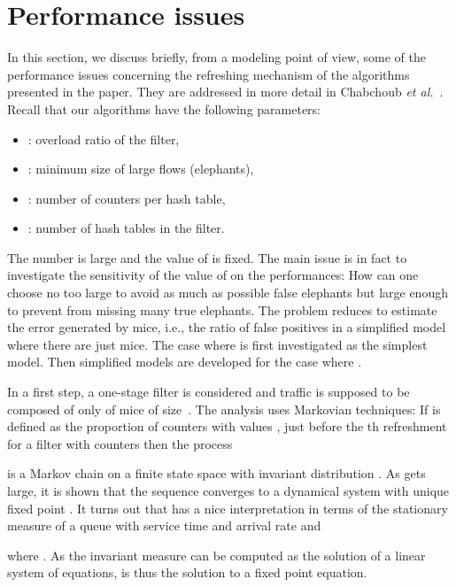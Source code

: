\documentclass{amsart}
\def\etal{{\em et al.}}
\begin{document}
\section{Performance issues} \label{discussion}
In  this section,  we  discuss  briefly, from  a  modeling point  of  view,  some of  the
performance issues concerning the refreshing  mechanism of the algorithms presented in the
paper.      They     are      addressed      in     more      detail     in      Chabchoub
\etal~\cite{Chabchoub:02,Chabchoub-3}.   Recall  that our  algorithms  have the  following
parameters:
\begin{itemize}
\item : overload ratio of the filter,
\item : minimum size of large flows (elephants), 
\item : number of counters per hash table,
\item : number of hash tables in the filter.
\end{itemize}
The number   is large  and the value  of  is  fixed.  The main  issue is in  fact to
investigate the sensitivity  of the value of   on the performances: How  can one choose
 no too large to avoid as much  as possible false elephants but large enough to prevent
from missing many true elephants.  The  problem reduces to estimate the error generated by
mice, i.e., the ratio of false positives  in a simplified model where there are just mice.
The case where  is first  investigated as the simplest model.  Then simplified models
are developed for the case where .

 In a first step, a one-stage filter  is considered and traffic is supposed to be composed
 of only  of mice of size~.  The  analysis uses Markovian techniques:  If  is
 defined as  the proportion of counters  with values ,  just before
 the th refreshment for a filter with  counters then the process

 is a Markov  chain on a finite  state space with invariant distribution  .  As 
 gets large,  it is shown that the  sequence   converges to a
 dynamical system with  unique fixed point . It turns  out that 
 has  a nice  interpretation  in terms  of  the stationary  measure   of  a
  queue with service time  and arrival rate  and

where .   As the  invariant measure   can be
computed as the solution of a linear system of  equations,  is
thus the solution to a fixed point equation.
\end{document}
